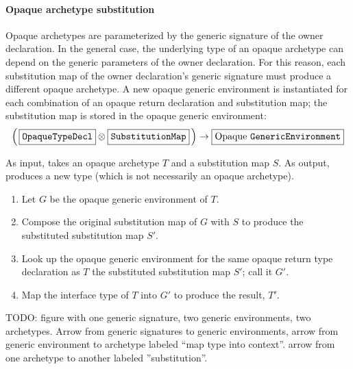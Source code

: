 \documentclass[../generics]{subfiles}
\begin{document}
\paragraph{Opaque archetype substitution}
Opaque archetypes are parameterized by the generic signature of the owner declaration. In the general case, the underlying type of an opaque archetype can depend on the generic parameters of the owner declaration. For this reason, each substitution map of the owner declaration's generic signature must produce a different opaque archetype. A new opaque generic environment is instantiated for each combination of an opaque return declaration and substitution map; the substitution map is stored in the opaque generic environment:
\[\left(\,\ttbox{OpaqueTypeDecl}\otimes \ttbox{SubstitutionMap}\,\right) \rightarrow \mathboxed{Opaque \texttt{GenericEnvironment}}\]

\begin{algorithm}\label{opaquearchetypesubst}
As input, takes an opaque archetype $T$ and a substitution map $S$. As output, produces a new type (which is not necessarily an opaque archetype).
\begin{enumerate}
\item Let $G$ be the opaque generic environment of $T$.
\item Compose the original substitution map of $G$ with $S$ to produce the substituted substitution map $S'$.
\item Look up the opaque generic environment for the same opaque return type declaration as $T$ the substituted substitution map $S'$; call it $G'$.
\item Map the interface type of $T$ into $G'$ to produce the result, $T'$.
\end{enumerate}
\end{algorithm}

TODO: figure with one generic signature, two generic environments, two archetypes. Arrow from generic signatures to generic environments, arrow from generic environment to archetype labeled ``map type into context''. arrow from one archetype to another labeled ''substitution''.
\end{document}
